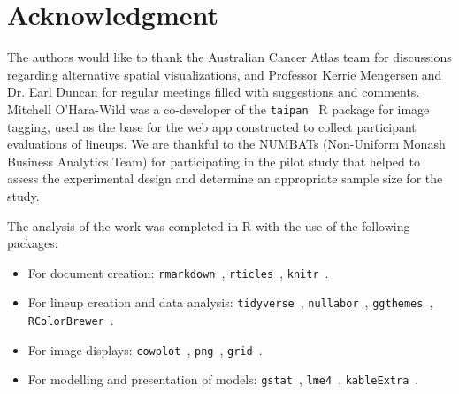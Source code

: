 \documentclass[journal]{vgtc}                     %
\begin{document}


\hypertarget{acknowledgment}{%
\section{Acknowledgment}\label{acknowledgment}}

The authors would like to thank the Australian Cancer Atlas team for discussions regarding alternative spatial visualizations, and Professor Kerrie Mengersen and Dr. Earl Duncan for regular meetings filled with suggestions and comments. Mitchell O'Hara-Wild was a co-developer of the \texttt{taipan}~\cite{taipan} R package for image tagging, used as the base for the web app constructed to collect participant evaluations of lineups. We are thankful to the NUMBATs (Non-Uniform Monash Business Analytics Team) for participating in the pilot study that helped to assess the experimental design and determine an appropriate sample size for the study.

The analysis of the work was completed in R  \cite{RCore} with the use of the following packages:

\begin{itemize} \itemsep 0in
\item
  For document creation: \texttt{rmarkdown}~\cite{rmarkdown}, \texttt{rticles}~\cite{rticles}, \texttt{knitr}~\cite{knitr}.
\item
  For lineup creation and data analysis: \texttt{tidyverse}~\cite{tidyverse}, \texttt{nullabor}~\cite{nullabor}, \texttt{ggthemes}~\cite{ggthemes}, \texttt{RColorBrewer}~\cite{RColorBrewer}.
\item
  For image displays: \texttt{cowplot}~\cite{cowplot}, \texttt{png}~\cite{png}, \texttt{grid}~\cite{grid}.
\item
  For modelling and presentation of models: \texttt{gstat}~\cite{gstat}, \texttt{lme4}~\cite{lme4}, \texttt{kableExtra}~\cite{kableExtra}.
\end{itemize}
\end{document}
